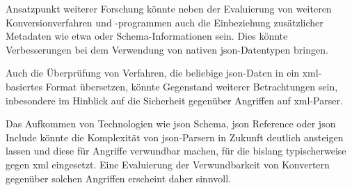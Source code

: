 Ansatzpunkt weiterer Forschung könnte neben der Evaluierung von weiteren Konversionverfahren und -programmen auch die Einbeziehung zusätzlicher Metadaten wie etwa  oder Schema-Informationen sein. Dies könnte Verbesserungen bei dem Verwendung von nativen \acrshort{json}-Datentypen bringen.

Auch die Überprüfung von Verfahren, die beliebige \acrshort{json}-Daten in ein \acrshort{xml}-basiertes Format übersetzen, könnte Gegenstand weiterer Betrachtungen sein, inbesondere im Hinblick auf die Sicherheit gegenüber Angriffen auf \acrshort{xml}-Parser.

Das Aufkommen von Technologien wie \acrshort{json} Schema, \acrshort{json} Reference oder \acrshort{json} Include könnte die Komplexität von \acrshort{json}-Parsern in Zukunft deutlich ansteigen lassen und diese für Angriffe verwundbar machen, für die bislang typischerweise gegen \acrshort{xml} eingesetzt. Eine Evaluierung der Verwundbarkeit von Konvertern gegenüber solchen Angriffen erscheint daher sinnvoll.
